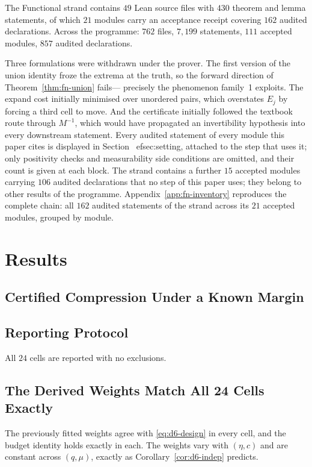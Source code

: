 \documentclass[conference]{IEEEtran}
\theoremstyle{definition}
\begin{document}
The Functional strand contains $49$ Lean source files with $430$ theorem and lemma
statements, of which $21$ modules carry an acceptance receipt covering $162$ audited
declarations. Across the programme: $762$ files, $7{,}199$ statements, $111$ accepted modules,
$857$ audited declarations.

Three formulations were withdrawn under the prover. The first version of the union identity
froze the extrema at the truth, so the forward direction of Theorem~\ref{thm:fn-union} fails---
precisely the phenomenon family~1 exploits. The expand cost initially minimised over unordered
pairs, which overstates $E_{j}$ by forcing a third cell to move. And the certificate initially
followed the textbook route through $M^{-1}$, which would have propagated an invertibility
hypothesis into every downstream statement. Every audited statement of every module this paper cites is displayed in Section~
ef{sec:setting}, attached to the step that uses it; only positivity checks and measurability side conditions are omitted, and their count is given at each block. The strand contains a further $15$ accepted modules carrying $106$ audited declarations that no step of this paper uses; they belong to other results of the programme. Appendix~\ref{app:fn-inventory} reproduces the complete chain: all $162$ audited statements of the strand across its $21$ accepted modules, grouped by module.


\section{Results}

\subsection{Certified Compression Under a Known Margin}
\label{sec:d6-results}

\subsection{Reporting Protocol}

All $24$ cells are reported with no exclusions.

\subsection{The Derived Weights Match All 24 Cells Exactly}

The previously fitted weights agree with \eqref{eq:d6-design} in every cell, and the budget
identity holds exactly in each. The weights vary with $(\eta,c)$ and are constant across
$(q,\mu)$, exactly as Corollary~\ref{cor:d6-indep} predicts.
\end{document}
